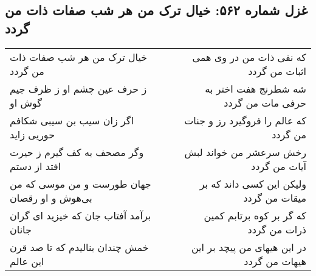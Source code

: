 \begin{center}
\section*{غزل شماره ۵۶۲: خیال ترک من هر شب صفات ذات من گردد}
\label{sec:0562}
\begin{longtable}{l p{0.5cm} r}
خیال ترک من هر شب صفات ذات من گردد
&&
که نفی ذات من در وی همی اثبات من گردد
\\
ز حرف عین چشم او ز ظرف جیم گوش او
&&
شه شطرنج هفت اختر به حرفی مات من گردد
\\
اگر زان سیب بن سیبی شکافم حوریی زاید
&&
که عالم را فروگیرد رز و جنات من گردد
\\
وگر مصحف به کف گیرم ز حیرت افتد از دستم
&&
رخش سرعشر من خواند لبش آیات من گردد
\\
جهان طورست و من موسی که من بی‌هوش و او رقصان
&&
ولیکن این کسی داند که بر میقات من گردد
\\
برآمد آفتاب جان که خیزید ای گران جانان
&&
که گر بر کوه برتابم کمین ذرات من گردد
\\
خمش چندان بنالیدم که تا صد قرن این عالم
&&
در این هیهای من پیچد بر این هیهات من گردد
\\
\end{longtable}
\end{center}
